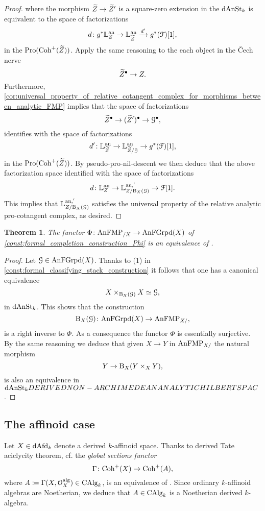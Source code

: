 \documentclass[10pt,a4paper,reqno]{amsart} %
\theoremstyle{plain}
\newtheorem{thm}{Theorem}[section]
\theoremstyle{definition}
\theoremstyle{remark}
\numberwithin{equation}{section}
\begin{document}
\begin{proof}
    where the morphism $\widetilde Z \to \widetilde Z'$ is a square-zero extension in the \infcat $\mathrm{dAnSt}_k$ is equivalent to the space of factorizations
        \[
            d \colon g^*  \mathbb L^\mathrm{an}_Z \to \mathbb L^\mathrm{an}_{\widetilde Z} \xrightarrow{{d'}} g^*(\mathcal F)[1],
        \]
    in the \infcat $\mathrm{Pro}(\mathrm{Coh}^+(\widetilde Z))$. Apply the same reasoning to the each object in the \v{C}ech nerve
        \[
            \widetilde Z^\bullet \to Z.  
        \]
    Furthermore, \cref{cor:universal_property_of_relative_cotangent_complex_for_morphisms_between_analytic_FMP}
    implies that the space of factorizations
        \[
            \widetilde Z^\bullet \to (\widetilde Z')^\bullet \to \mathcal G^\bullet,  
        \]
    identifies with the space of factorizations
        \[
            d' \colon \mathbb L^\mathrm{an}_{\widetilde Z} \to \mathbb L^\mathrm{an}_{\widetilde Z/ \mathcal G} \to g^*(\mathcal F)[1],
        \]  
    in the \infcat $\mathrm{Pro}(\mathrm{Coh}^+(\widetilde Z))$. By pseudo-pro-nil-descent we then deduce that the above factorization space identified with the space
    of factorizations
        \[
            d \colon \mathbb L^\mathrm{an}_Z \to \mathbb L^{\mathrm{an}, '}_{Z/ \mathrm B_X(\mathcal G)} \to \mathcal F[1].
        \]
    This implies that $\mathbb L^{\mathrm{an}, '}_{Z/ \mathrm B_X(\mathcal G)}$ satisfies the universal property of the relative analytic pro-cotangent complex, as desired.
\end{proof}

\begin{thm} \label{thm:Phi_is_an_equivalence}
    The functor $\Phi \colon \mathrm{AnFMP}_{/X} \to \mathrm{AnFGrpd}(X)$ of \cref{const:formal_completion_construction_Phi} is an equivalence of \infcats.
\end{thm}

\begin{proof} Let $\mathcal G \in \mathrm{AnFGrpd}(X)$.
    Thanks to (1) in \cref{const:formal_classifying_stack_construction} it follows that one has a canonical equivalence
        \[
            X \times_{\mathrm B_X(\mathcal G)} X \simeq \mathcal G,
        \]
    in $\mathrm{dAnSt}_k$. This shows that the construction
        \[
            \mathrm B_X(\mathcal G) \colon \mathrm{AnFGrpd}(X) \to \mathrm{AnFMP}_{X/},  
        \]
    is a right inverse to $\Phi$. As a consequence the functor $\Phi$ is essentially surjective. By the same reasoning we deduce that
    given $X \to Y $ in $\mathrm{AnFMP}_{X/}$ the natural morphism
        \[
              Y \to \mathrm B_X(Y \times_X Y),
        \]
    is also an equivalence in $\mathrm{dAnSt}_kDERIVED NON-ARCHIMEDEAN ANALYTIC HILBERT SPAC$.
\end{proof}

\subsection{The affinoid case} Let $X \in \mathrm{dAfd}_k$ denote a derived $k$-affinoid space.
Thanks to derived Tate aciclycity theorem, cf. \cite[Theorem 3.1]{Porta_Yu_Derived_Hom_spaces}
the \emph{global sections functor}
    \[
        \Gamma \colon \mathrm{Coh}^+(X) \to  \mathrm{Coh}^+(A),
    \]
where $A \coloneqq \Gamma(X, \mathcal O_X ^\mathrm{alg}) \in \mathrm{CAlg}_k$, is an equivalence of \infcats. Since ordinary $k$-affinoid algebras are Noetherian, we deduce that
$A \in \mathrm{CAlg}_k$ is a Noetherian derived $k$-algebra.
\end{document}
